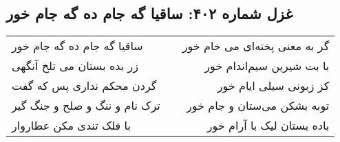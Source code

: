 \begin{center}
\section*{غزل شماره ۴۰۲: ساقیا گه جام ده گه جام خور}
\label{sec:402}
\begin{longtable}{l p{0.5cm} r}
ساقیا گه جام ده گه جام خور
&&
گر به معنی پخته‌ای می خام خور
\\
زر بده بستان می تلخ آنگهی
&&
با بت شیرین سیم‌اندام خور
\\
گردن محکم نداری پس که گفت
&&
کز زبونی سیلی ایام خور
\\
ترک نام و ننگ و صلح و جنگ گیر
&&
توبه بشکن می‌ستان و جام خور
\\
با فلک تندی مکن عطاروار
&&
باده بستان لیک با آرام خور
\\
\end{longtable}
\end{center}
